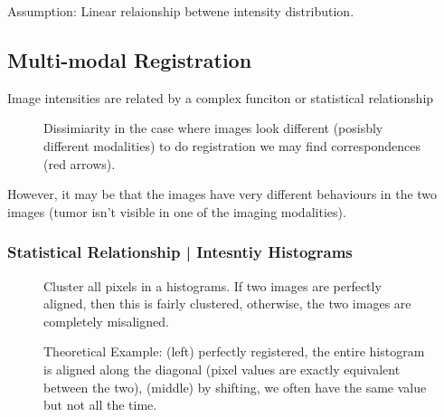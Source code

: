 \documentclass[11pt]{article}
\begin{document}
Assumption: Linear relaionship betwene intensity distribution.

\subsection{Multi-modal Registration}

Image intensities are related by a complex funciton or statistical relationship

\begin{figure}[H]
    \centering
    \caption*{Dissimiarity in the case where images look different (posisbly different modalities) to do registration we may find correspondences (red arrows).}
\end{figure}

However, it may be that the images have very different behaviours in the two images (tumor isn't visible in one of the imaging modalities).

\subsubsection{Statistical Relationship | Intesntiy Histograms}

\begin{figure}[H]
    \centering
    \caption*{Cluster all pixels in a histograms. If two images are perfectly aligned, then this is fairly clustered, otherwise, the two images are completely misaligned.}
\end{figure}

\begin{figure}[H]
    \centering
    \caption*{Theoretical Example: (left) perfectly registered, the entire histogram is aligned along the diagonal (pixel values are exactly equivalent between the two), (middle) by shifting, we often have the same value but not all the time.}
\end{figure}

\begin{figure}[H]
    \centering
\end{figure}
\end{document}
